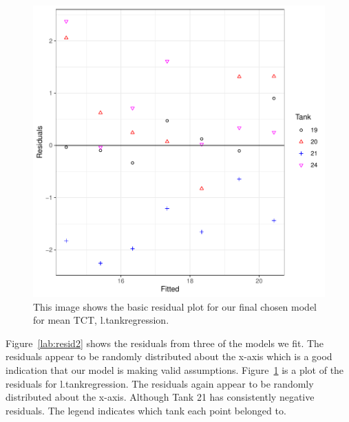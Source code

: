 \begin{figure}[H]
\includegraphics{Chapter3Images/ltankregressionresid.pdf}
\caption{ This image shows the basic residual plot for our final chosen model for mean TCT, l.tankregression.}
\label{lab:resid22}
\end{figure}

Figure~\ref{lab:resid2} shows the residuals from three of the models we fit. The residuals appear to be randomly distributed about the x-axis which is a good indication that our model is making valid assumptions. Figure~\ref{lab:resid22} is a plot of the residuals for l.tankregression. The residuals again appear to be randomly distributed about the x-axis. Although Tank 21 has consistently negative residuals. The legend indicates which tank each point belonged to.


